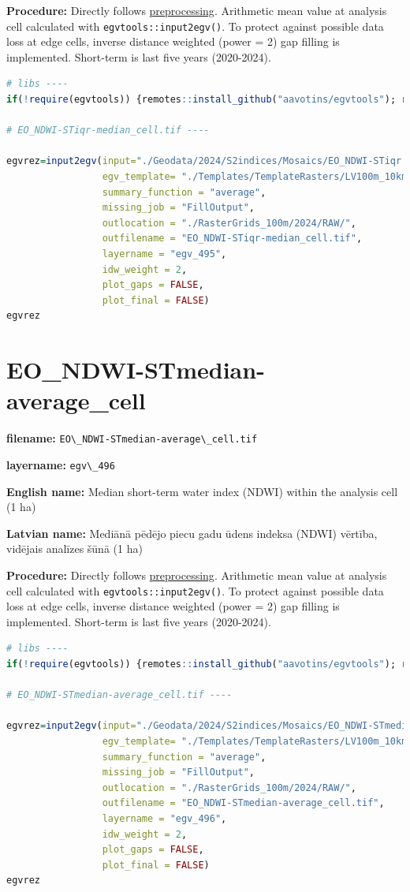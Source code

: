 \documentclass[
]{book}
\newcommand{\passthrough}[1]{#1}
\begin{document}
\textbf{Procedure:} Directly follows \hyperref[Ch04.13]{preprocessing}. Arithmetic mean value at analysis cell
calculated with \passthrough{\lstinline!egvtools::input2egv()!}. To protect against possible data loss at edge cells,
inverse distance weighted (power = 2) gap filling is implemented. Short-term is last five years (2020-2024).

\begin{lstlisting}[language=R]
# libs ----
if(!require(egvtools)) {remotes::install_github("aavotins/egvtools"); require(egvtools)}

# EO_NDWI-STiqr-median_cell.tif ----

egvrez=input2egv(input="./Geodata/2024/S2indices/Mosaics/EO_NDWI-STiqr.tif",
                 egv_template= "./Templates/TemplateRasters/LV100m_10km.tif",
                 summary_function = "average",
                 missing_job = "FillOutput",
                 outlocation = "./RasterGrids_100m/2024/RAW/",
                 outfilename = "EO_NDWI-STiqr-median_cell.tif",
                 layername = "egv_495",
                 idw_weight = 2,
                 plot_gaps = FALSE,
                 plot_final = FALSE)
egvrez
\end{lstlisting}

\section{EO\_NDWI-STmedian-average\_cell}\label{ch06.496}

\textbf{filename:} \passthrough{\lstinline!EO\_NDWI-STmedian-average\_cell.tif!}

\textbf{layername:} \passthrough{\lstinline!egv\_496!}

\textbf{English name:} Median short-term water index (NDWI) within the analysis cell (1 ha)

\textbf{Latvian name:} Mediānā pēdējo piecu gadu ūdens indeksa (NDWI) vērtība, vidējais analīzes šūnā (1 ha)

\textbf{Procedure:} Directly follows \hyperref[Ch04.13]{preprocessing}. Arithmetic mean value at analysis cell
calculated with \passthrough{\lstinline!egvtools::input2egv()!}. To protect against possible data loss at edge cells,
inverse distance weighted (power = 2) gap filling is implemented. Short-term is last five years (2020-2024).

\begin{lstlisting}[language=R]
# libs ----
if(!require(egvtools)) {remotes::install_github("aavotins/egvtools"); require(egvtools)}

# EO_NDWI-STmedian-average_cell.tif ----

egvrez=input2egv(input="./Geodata/2024/S2indices/Mosaics/EO_NDWI-STmedian.tif",
                 egv_template= "./Templates/TemplateRasters/LV100m_10km.tif",
                 summary_function = "average",
                 missing_job = "FillOutput",
                 outlocation = "./RasterGrids_100m/2024/RAW/",
                 outfilename = "EO_NDWI-STmedian-average_cell.tif",
                 layername = "egv_496",
                 idw_weight = 2,
                 plot_gaps = FALSE,
                 plot_final = FALSE)
egvrez
\end{lstlisting}
\end{document}
